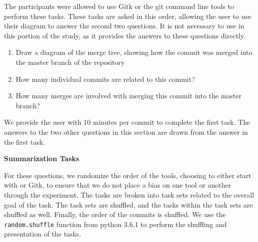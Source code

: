 The participants were allowed to use Gitk or the git command line tools
to perform these tasks. These tasks are asked in this order, allowing
the user to use their diagram to answer the second two questions. It is
not necessary to use \tool in this portion of the study, as it provides
the answers to these questions directly.

\begin{enumerate}
  \item Draw a diagram of the merge tree, showing how the commit was
    merged into the master branch of the repository
  \item How many individual commits are related to this commit?
  \item How many merges are involved with merging this commit into the
    master branch?
\end{enumerate}

We provide the user with 10 minutes per commit to complete the first
task. The answers to the two other questions in this section are drawn
from the answer in the first task.

\textbf{Summarization Tasks}

For these questions, we randomize the order of the tools, choosing to
either start with \tool or Gitk, to ensure that we do not place a bias
on one tool or another through the experiment. The tasks are broken
into task sets related to the overall goal of the task. The task sets
are shuffled, and the tasks within the task sets are shuffled as well.
Finally, the order of the commits is shuffled. We use the
\verb|random.shuffle| function from python 3.6.1 to perform the
shuffling and presentation of the tasks.

